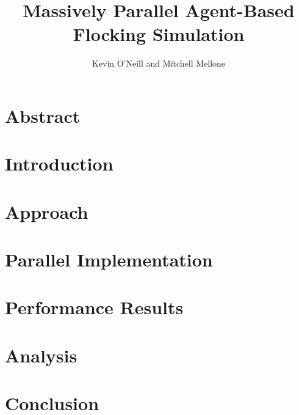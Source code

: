 \documentclass[10pt]{article}
\title{Massively Parallel Agent-Based Flocking Simulation}
\author{Kevin O'Neill and Mitchell Mellone}
\date{}
\begin{document}
\maketitle
\begin{multicols}{2}
  
  \section*{Abstract}
  
  
  \section{Introduction}
  \section{Approach}
  \section{Parallel Implementation}
  \section{Performance Results}
  \section{Analysis}
  \section{Conclusion}
  
\end{multicols}
\end{document}
